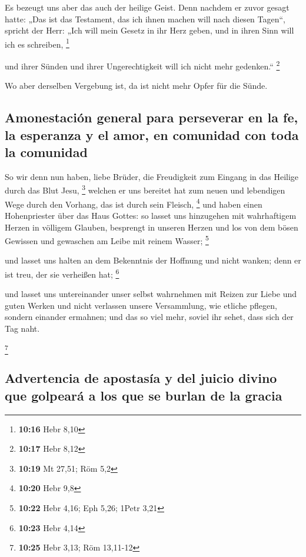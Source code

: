  Es bezeugt uns aber das auch der heilige Geist. Denn
nachdem er zuvor gesagt hatte:  „Das ist das Testament,
das ich ihnen machen will nach diesen Tagen``, spricht der Herr: „Ich
will mein Gesetz in ihr Herz geben, und in ihren Sinn will ich es
schreiben, \footnote{\textbf{10:16} Hebr 8,10}

 und ihrer Sünden und ihrer Ungerechtigkeit will ich
nicht mehr gedenken.`` \footnote{\textbf{10:17} Hebr 8,12}

 Wo aber derselben Vergebung ist, da ist nicht mehr Opfer
für die Sünde.

\hypertarget{amonestaciuxf3n-general-para-perseverar-en-la-fe-la-esperanza-y-el-amor-en-comunidad-con-toda-la-comunidad}{%
\subsection{Amonestación general para perseverar en la fe, la esperanza
y el amor, en comunidad con toda la
comunidad}\label{amonestaciuxf3n-general-para-perseverar-en-la-fe-la-esperanza-y-el-amor-en-comunidad-con-toda-la-comunidad}}

 So wir denn nun haben, liebe Brüder, die Freudigkeit zum
Eingang in das Heilige durch das Blut Jesu, \footnote{\textbf{10:19} Mt
  27,51; Röm 5,2}  welchen er uns bereitet hat zum neuen
und lebendigen Wege durch den Vorhang, das ist durch sein Fleisch,
\footnote{\textbf{10:20} Hebr 9,8}  und haben einen
Hohenpriester über das Haus Gottes:  so lasset uns
hinzugehen mit wahrhaftigem Herzen in völligem Glauben, besprengt in
unseren Herzen und los von dem bösen Gewissen und gewaschen am Leibe mit
reinem Wasser; \footnote{\textbf{10:22} Hebr 4,16; Eph 5,26; 1Petr 3,21}

 und lasset uns halten an dem Bekenntnis der Hoffnung und
nicht wanken; denn er ist treu, der sie verheißen hat; \footnote{\textbf{10:23}
  Hebr 4,14}

 und lasset uns untereinander unser selbst wahrnehmen mit
Reizen zur Liebe und guten Werken  und nicht verlassen
unsere Versammlung, wie etliche pflegen, sondern einander ermahnen; und
das so viel mehr, soviel ihr sehet, dass sich der Tag naht.

\footnote{\textbf{10:25} Hebr 3,13; Röm 13,11-12}

\hypertarget{advertencia-de-apostasuxeda-y-del-juicio-divino-que-golpearuxe1-a-los-que-se-burlan-de-la-gracia}{%
\subsection{Advertencia de apostasía y del juicio divino que golpeará a
los que se burlan de la
gracia}\label{advertencia-de-apostasuxeda-y-del-juicio-divino-que-golpearuxe1-a-los-que-se-burlan-de-la-gracia}}


